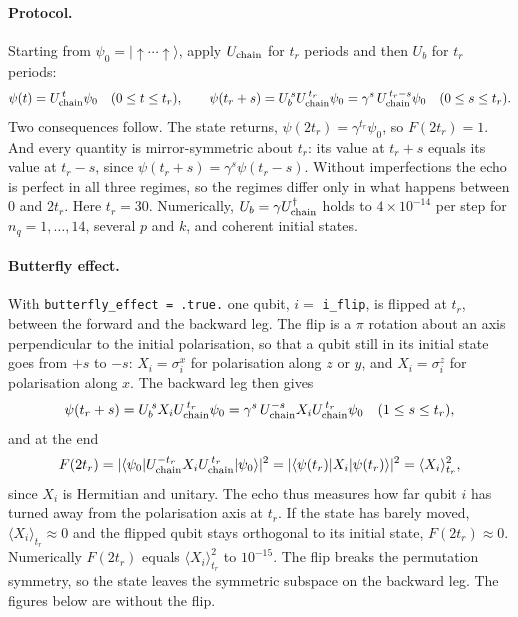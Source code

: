 \documentclass[11pt,a4paper]{article}
\begin{document}
\paragraph{Protocol.}
Starting from $\psi_0=|{\uparrow\cdots\uparrow}\rangle$, apply $U_{\rm chain}$ for $t_r$ periods and then $U_b$ for
$t_r$ periods:
\begin{equation}
  \psi(t) = U_{\rm chain}^{\,t}\psi_0\quad (0\le t\le t_r),\qquad
  \psi(t_r+s) = U_b^{\,s}U_{\rm chain}^{\,t_r}\psi_0 = \gamma^s\,U_{\rm chain}^{\,t_r-s}\psi_0
  \quad(0\le s\le t_r).
\end{equation}
Two consequences follow. The state returns, $\psi(2t_r)=\gamma^{t_r}\psi_0$, so $F(2t_r)=1$. And every quantity is
mirror-symmetric about $t_r$: its value at $t_r+s$ equals its value at $t_r-s$, since $\psi(t_r+s)=\gamma^s\psi(t_r-s)$.
Without imperfections the echo is perfect in all three regimes, so the regimes differ only in what happens between
$0$ and $2t_r$. Here $t_r=30$. Numerically, $U_b=\gamma U_{\rm chain}^\dagger$ holds to $4\times10^{-14}$ per step for
$n_q=1,\dots,14$, several $p$ and $k$, and coherent initial states.

\paragraph{Butterfly effect.}
With \texttt{butterfly\_effect = .true.} one qubit, $i=$ \texttt{i\_flip}, is flipped at $t_r$, between the forward
and the backward leg. The flip is a $\pi$ rotation about an axis perpendicular to the initial polarisation, so that a
qubit still in its initial state goes from $+s$ to $-s$: $X_i=\sigma^x_i$ for polarisation along $z$ or $y$, and
$X_i=\sigma^z_i$ for polarisation along $x$. The backward leg then gives
\begin{equation}
  \psi(t_r+s) = U_b^{\,s}X_iU_{\rm chain}^{\,t_r}\psi_0 = \gamma^s\,U_{\rm chain}^{-s}X_iU_{\rm chain}^{\,t_r}\psi_0
  \quad(1\le s\le t_r),
\end{equation}
and at the end
\begin{equation}
  F(2t_r) = |\langle\psi_0|U_{\rm chain}^{-t_r}X_iU_{\rm chain}^{\,t_r}|\psi_0\rangle|^2
  = |\langle\psi(t_r)|X_i|\psi(t_r)\rangle|^2 = \langle X_i\rangle_{t_r}^2 ,
\end{equation}
since $X_i$ is Hermitian and unitary. The echo thus measures how far qubit $i$ has turned away from the polarisation
axis at $t_r$. If the state has barely moved, $\langle X_i\rangle_{t_r}\approx0$ and the flipped qubit stays orthogonal
to its initial state, $F(2t_r)\approx0$. Numerically $F(2t_r)$ equals $\langle X_i\rangle_{t_r}^2$ to $10^{-15}$. The
flip breaks the permutation symmetry, so the state leaves the symmetric subspace on the backward leg. The figures below
are without the flip.
\end{document}
